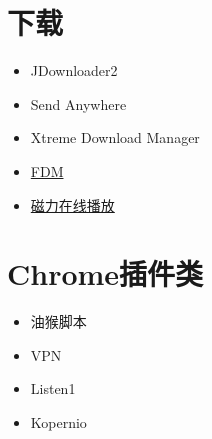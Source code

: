 \documentclass[UTF8,oneside]{ctexbook}
\begin{document}
\section{下载}
\begin{itemize}
	\item JDownloader2
	\item Send Anywhere
	\item Xtreme Download Manager
	\item \href{https://www.freedownloadmanager.org/}{FDM}
	\item \href{https://webtorrent.io}{磁力在线播放}
\end{itemize}

\section{Chrome插件类}
\begin{itemize}
	\item 油猴脚本
	\item VPN
	\item Listen1
	\item Kopernio
\end{itemize}
\end{document}

